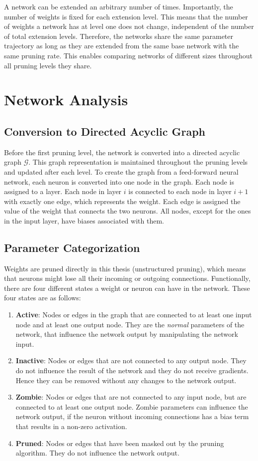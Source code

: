 A network can be extended an arbitrary number of times.
Importantly, the number of weights is fixed for each extension level.
This means that the number of weights a network has at level one does not change, independent of the number of total extension levels.
Therefore, the networks share the same parameter trajectory as long as they are extended from the same base network with the same pruning rate.
This enables comparing networks of different sizes throughout all pruning levels they share.


\section{Network Analysis}
\subsection{Conversion to Directed Acyclic Graph}
Before the first pruning level, the network is converted into a directed acyclic graph $\mathcal{G}$.
This graph representation is maintained throughout the pruning levels and updated after each level.
To create the graph from a feed-forward neural network, each neuron is converted into one node in the graph.
Each node is assigned to a layer.
Each node in layer $i$ is connected to each node in layer $i+1$ with exactly one edge, which represents the weight.
Each edge is assigned the value of the weight that connects the two neurons.
All nodes, except for the ones in the input layer, have biases associated with them.

\subsection{Parameter Categorization}
Weights are pruned directly in this thesis (unstructured pruning), which means that neurons might lose all their incoming or outgoing connections. 
Functionally, there are four different states a weight or neuron can have in the network.
These four states are as follows:
\begin{enumerate}
\item \textbf{Active}: Nodes or edges in the graph that are connected to at least one input node and at least one output node. They are the \textit{normal} parameters of the network, that influence the network output by manipulating the network input.
\item \textbf{Inactive}: Nodes or edges that are not connected to any output node. They do not influence the result of the network and they do not receive gradients. Hence they can be removed without any changes to the network output.
\item \textbf{Zombie}: Nodes or edges that are not connected to any input node, but are connected to at least one output node. Zombie parameters can influence the network output, if the neuron without incoming connections has a bias term that results in a non-zero activation.
\item \textbf{Pruned}: Nodes or edges that have been masked out by the pruning algorithm. They do not influence the network output.
\end{enumerate}

